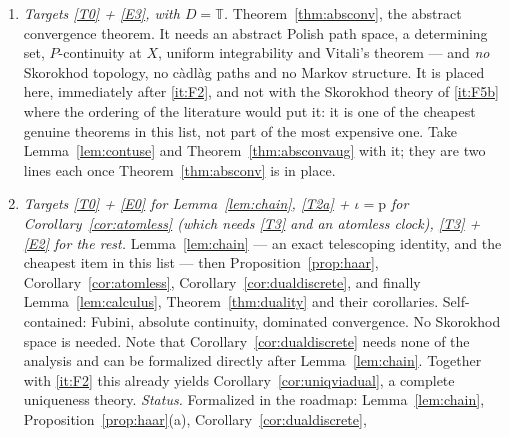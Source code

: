 \documentclass[11pt,a4paper]{article}
\theoremstyle{plain}
\theoremstyle{definition}
\theoremstyle{remark}
\newcommand{\T}{\mathbb{T}}                     %
\begin{document}
\begin{enumerate}[label=\textbf{(F\arabic*)}]
  of the work sits in Lemma~\ref{lem:restart}, which is four lines; the two
  theorems that follow are bookkeeping.  Theorem~\ref{thm:absstrongmarkov}
  additionally needs Fact~\ref{fact:optsampl} and c\`adl\`ag paths and should be
  deferred until after \ref{it:F4}, and so should the local theory of
  Section~\ref{ssec:localmp} --- Definition~\ref{def:localizing} is about
  stopping times.  Note that
  Lemma~\ref{lem:L1auto} is the only genuinely new proof there;
  Lemma~\ref{lem:localrestart} is
  Lemma~\ref{lem:restart} plus the one identity \eqref{eq:shiftedstopped}, and
  Theorem~\ref{thm:localuniq} is bookkeeping.
  \emph{Status.}  Lemma~\ref{lem:restart} and Theorem~\ref{thm:absuniq} are
  formalized in the roadmap; Lemma~\ref{lem:mixture}, Lemma~\ref{lem:disint}
  and the local theory are not.
\item \label{it:F5a}
  \emph{Targets \eqref{T0} + \eqref{E3}, with $D = \T$.}
  Theorem~\ref{thm:absconv}, the abstract convergence theorem.  It needs an
  abstract Polish path space, a determining set, $P$-continuity at $X$, uniform
  integrability and Vitali's theorem --- and \emph{no} Skorokhod topology, no
  c\`adl\`ag paths and no Markov structure.  It is placed here, immediately after
  \ref{it:F2}, and not with the Skorokhod theory of \ref{it:F5b} where the
  ordering of the literature would put it: it is one of the cheapest genuine
  theorems in this list, not part of the most expensive one.  Take
  Lemma~\ref{lem:contuse} and Theorem~\ref{thm:absconvaug} with it; they are two
  lines each once Theorem~\ref{thm:absconv} is in place.
\item \label{it:F3}
  \emph{Targets \eqref{T0} + \eqref{E0} for Lemma~\ref{lem:chain}, \eqref{T2a} + $\iota = \mathrm{p}$
  for Corollary~\ref{cor:atomless} (which needs \eqref{T3} and an atomless clock),
  \eqref{T3} + \eqref{E2} for the rest.}
  Lemma~\ref{lem:chain} --- an exact telescoping identity, and the cheapest item
  in this list --- then Proposition~\ref{prop:haar}, Corollary~\ref{cor:atomless},
  Corollary~\ref{cor:dualdiscrete}, and finally Lemma~\ref{lem:calculus},
  Theorem~\ref{thm:duality} and their corollaries.  Self-contained: Fubini,
  absolute continuity, dominated convergence.  No Skorokhod space is needed.
  Note that Corollary~\ref{cor:dualdiscrete} needs none of the analysis and can
  be formalized directly after Lemma~\ref{lem:chain}.  Together with \ref{it:F2} this already yields
  Corollary~\ref{cor:uniqviadual}, a complete uniqueness theory.
  \emph{Status.}  Formalized in the roadmap: Lemma~\ref{lem:chain},
  Proposition~\ref{prop:haar}(a), Corollary~\ref{cor:dualdiscrete},

\end{enumerate}
\end{document}
